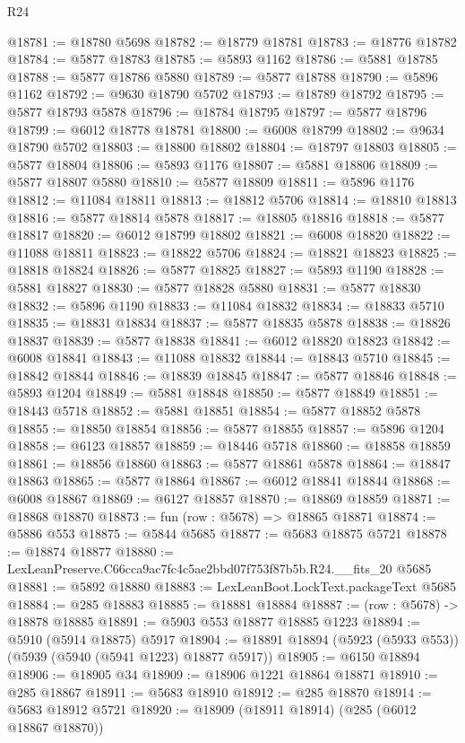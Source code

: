 \begin{lexlean}{R24}
\begin{coremodule}
@18781 := @18780 @5698
@18782 := @18779 @18781
@18783 := @18776 @18782
@18784 := @5877 @18783
@18785 := @5893 @1162
@18786 := @5881 @18785
@18788 := @5877 @18786 @5880
@18789 := @5877 @18788
@18790 := @5896 @1162
@18792 := @9630 @18790 @5702
@18793 := @18789 @18792
@18795 := @5877 @18793 @5878
@18796 := @18784 @18795
@18797 := @5877 @18796
@18799 := @6012 @18778 @18781
@18800 := @6008 @18799
@18802 := @9634 @18790 @5702
@18803 := @18800 @18802
@18804 := @18797 @18803
@18805 := @5877 @18804
@18806 := @5893 @1176
@18807 := @5881 @18806
@18809 := @5877 @18807 @5880
@18810 := @5877 @18809
@18811 := @5896 @1176
@18812 := @11084 @18811
@18813 := @18812 @5706
@18814 := @18810 @18813
@18816 := @5877 @18814 @5878
@18817 := @18805 @18816
@18818 := @5877 @18817
@18820 := @6012 @18799 @18802
@18821 := @6008 @18820
@18822 := @11088 @18811
@18823 := @18822 @5706
@18824 := @18821 @18823
@18825 := @18818 @18824
@18826 := @5877 @18825
@18827 := @5893 @1190
@18828 := @5881 @18827
@18830 := @5877 @18828 @5880
@18831 := @5877 @18830
@18832 := @5896 @1190
@18833 := @11084 @18832
@18834 := @18833 @5710
@18835 := @18831 @18834
@18837 := @5877 @18835 @5878
@18838 := @18826 @18837
@18839 := @5877 @18838
@18841 := @6012 @18820 @18823
@18842 := @6008 @18841
@18843 := @11088 @18832
@18844 := @18843 @5710
@18845 := @18842 @18844
@18846 := @18839 @18845
@18847 := @5877 @18846
@18848 := @5893 @1204
@18849 := @5881 @18848
@18850 := @5877 @18849
@18851 := @18443 @5718
@18852 := @5881 @18851
@18854 := @5877 @18852 @5878
@18855 := @18850 @18854
@18856 := @5877 @18855
@18857 := @5896 @1204
@18858 := @6123 @18857
@18859 := @18446 @5718
@18860 := @18858 @18859
@18861 := @18856 @18860
@18863 := @5877 @18861 @5878
@18864 := @18847 @18863
@18865 := @5877 @18864
@18867 := @6012 @18841 @18844
@18868 := @6008 @18867
@18869 := @6127 @18857
@18870 := @18869 @18859
@18871 := @18868 @18870
@18873 := fun (row : @5678) => @18865 @18871
@18874 := @5886 @553
@18875 := @5844 @5685
@18877 := @5683 @18875 @5721
@18878 := @18874 @18877
@18880 := LexLeanPreserve.C66cca9ac7fc4c5ae2bbd07f753f87b5b.R24.__fits_20 @5685
@18881 := @5892 @18880
@18883 := LexLeanBoot.LockText.packageText @5685
@18884 := @285 @18883
@18885 := @18881 @18884
@18887 := (row : @5678) -> @18878 @18885
@18891 := @5903 @553 @18877 @18885 @1223
@18894 := @5910 (@5914 @18875) @5917
@18904 := @18891 @18894 (@5923 (@5933 @553)) (@5939 (@5940 (@5941 @1223) @18877 @5917))
@18905 := @6150 @18894
@18906 := @18905 @34
@18909 := @18906 @1221 @18864 @18871
@18910 := @285 @18867
@18911 := @5683 @18910
@18912 := @285 @18870
@18914 := @5683 @18912 @5721
@18920 := @18909 (@18911 @18914) (@285 (@6012 @18867 @18870))

\end{coremodule}
\end{lexlean}
